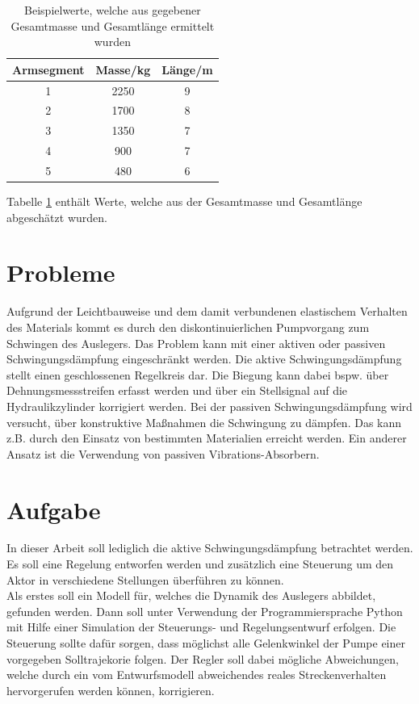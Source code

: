 \begin{table}[h!]
\centering
\begin{tabular}{c|c|c}
\rule[-1ex]{0pt}{2.5ex} Armsegment & Masse/kg & Länge/m \\ 
\hline \rule[-1ex]{0pt}{2.5ex} 1 & 2250 & 9 \\ 
\rule[-1ex]{0pt}{2.5ex} 2 & 1700 & 8 \\ 
\rule[-1ex]{0pt}{2.5ex} 3 & 1350 & 7 \\ 
\rule[-1ex]{0pt}{2.5ex} 4 & 900 & 7 \\ 
\rule[-1ex]{0pt}{2.5ex} 5 & 480 & 6 \\ 
\end{tabular} 
\caption{Beispielwerte, welche aus gegebener Gesamtmasse und Gesamtlänge ermittelt wurden}
\label{tab:WertePumpe}
\end{table}

Tabelle \ref{tab:WertePumpe} enthält Werte, welche aus der Gesamtmasse und Gesamtlänge abgeschätzt wurden.

\section{Probleme}
Aufgrund der Leichtbauweise und dem damit verbundenen elastischem Verhalten des Materials kommt es durch den diskontinuierlichen Pumpvorgang zum Schwingen des Auslegers. Das Problem kann mit einer aktiven oder passiven Schwingungsdämpfung eingeschränkt werden. Die aktive Schwingungsdämpfung stellt einen geschlossenen Regelkreis dar. Die Biegung kann dabei bspw. über Dehnungsmessstreifen erfasst werden und über ein Stellsignal auf die Hydraulikzylinder korrigiert werden. Bei der passiven Schwingungsdämpfung wird versucht, über konstruktive Maßnahmen die Schwingung zu dämpfen. Das kann z.B. durch den Einsatz von bestimmten Materialien erreicht werden. Ein anderer Ansatz ist die Verwendung von passiven Vibrations-Absorbern. 

\section{Aufgabe}
In dieser Arbeit soll lediglich die aktive Schwingungsdämpfung betrachtet werden. Es soll eine Regelung entworfen werden und zusätzlich eine Steuerung um den Aktor in verschiedene Stellungen überführen zu können. \\
Als erstes soll ein Modell für, welches die Dynamik des Auslegers abbildet, gefunden werden. Dann soll unter Verwendung der Programmiersprache Python mit Hilfe einer Simulation der Steuerungs- und Regelungsentwurf erfolgen. Die Steuerung sollte dafür sorgen, dass möglichst alle Gelenkwinkel der Pumpe einer vorgegeben Solltrajekorie folgen. Der Regler soll dabei mögliche Abweichungen, welche durch ein vom Entwurfsmodell abweichendes reales Streckenverhalten hervorgerufen werden können, korrigieren. 


